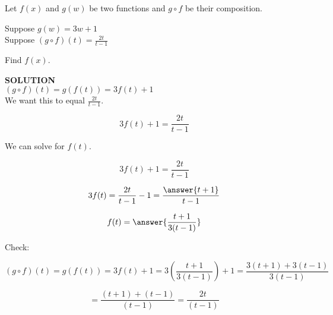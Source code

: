 \documentclass{ximera}
\begin{document}
\begin{example}


Let $f(x)$ and $g(w)$ be two functions and $g \circ f$ be their composition.


Suppose $g(w) = 3w + 1$ \\

Suppose $(g \circ f)(t) = \frac{2t}{t-1}$


Find $f(x)$.



\textbf{\textcolor{purple!50!blue!90!black}{SOLUTION}} \\




$(g \circ f)(t) =  g(f(t)) = 3 f(t) + 1$ \\


We want this to equal $\frac{2t}{t-1}$.




\[
3 f(t) + 1 = \frac{2t}{t-1}
\]


We can solve for $f(t)$.



\[
3 f(t) + 1 = \frac{2t}{t-1}
\]

\[
3 f(t) = \frac{2t}{t-1} - 1 = \frac{\answer{t+1}}{t-1}
\]

\[
f(t)  = \answer{\frac{t+1}{3(t-1)}}
\]



Check:

\[
(g \circ f)(t) =  g(f(t)) = 3 f(t) + 1 = 3 \left( \frac{t+1}{3(t-1)} \right) + 1 = \frac{3(t+1) + 3(t-1)}{3(t-1)} 
\]


\[
 = \frac{(t+1) + (t-1)}{(t-1)}  = \frac{2t}{(t-1)}
\]


\end{example}
\end{document}
